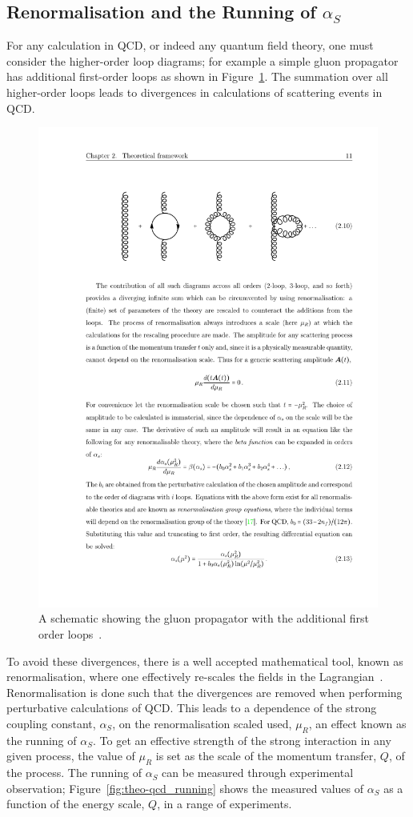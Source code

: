 \subsection{Renormalisation and the Running of $\alpha_S$}
\label{sec:theo-qcd_dijet_running}

For any calculation in QCD, or indeed any quantum field theory, one must consider the higher-order loop diagrams;
for example a simple gluon propagator has additional first-order loops as shown in Figure~\ref{fig:theo-qcd_gluon}.
The summation over all higher-order loops leads to divergences in calculations of scattering events in QCD.

\begin{figure}[!hbt]
  \begin{center}
    \includegraphics[width=0.5\linewidth, angle=0]{figs/Theory/qcd_gluon_loop.pdf}
  \end{center}
  \vspace{-1em}
  \caption[A schematic showing the gluon propagator with the additional first order loops.]
  {A schematic showing the gluon propagator with the additional first order loops~\cite{det-thesis_kate}.}
  \label{fig:theo-qcd_gluon}
\end{figure}

To avoid these divergences, there is a well accepted mathematical tool, known as renormalisation,
where one effectively re-scales the fields in the Lagrangian~\cite{theo-qcd}.
Renormalisation is done such that the divergences are removed
when performing perturbative calculations of QCD.
This leads to a dependence of the strong coupling constant, $\alpha_S$, on the renormalisation scaled used, $\mu_R$,
an effect known as the running of $\alpha_S$.
To get an effective strength of the strong interaction in any given process,
the value of $\mu_R$ is set as the scale of the momentum transfer, $Q$, of the process.
The running of $\alpha_{S}$ can be measured through experimental observation;
Figure~\ref{fig:theo-qcd_running} shows the measured values of $\alpha_S$
as a function of the energy scale, $Q$, in a range of experiments.

